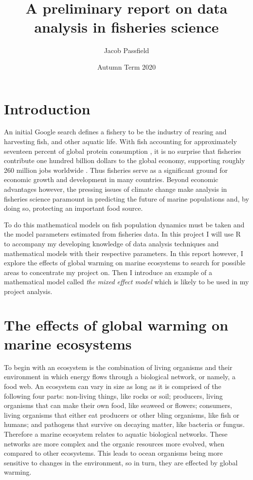 \documentclass{article}
\title{\huge{\bf{A preliminary report on data analysis in fisheries science}}}
\author{Jacob Passfield}
\date{Autumn Term 2020}
\begin{document}
\maketitle

\section{Introduction}

An initial Google search defines a fishery to be the industry of rearing and harvesting fish, and other aquatic life. With fish accounting for approximately seventeen percent of global protein consumption \cite{YouTube2017}, it is no surprise that fisheries contribute one hundred billion dollars to the global economy, supporting roughly 260 million jobs worldwide \cite{Big data}. Thus fisheries serve as a significant ground for economic growth and development in many countries. Beyond economic advantages however, the pressing issues of climate change make analysis in fisheries science paramount in predicting the future of marine populations and, by doing so, protecting an important food source. 

To do this mathematical models on fish population dynamics must be taken and the model parameters estimated from fisheries data. In this project I will use R to accompany my developing knowledge of data analysis techniques and mathematical models with their respective parameters. In this report however, I explore the effects of global warming on marine ecosystems to search for  possible areas to concentrate my project on. Then I introduce an example of a mathematical model called \textit{the mixed effect model} which is likely to be used in my project analysis. 

\section{The effects of global warming on marine ecosystems}

To begin with an ecosystem is the combination of living organisms and their environment in which energy flows through a biological network, or namely, a food web. An ecosystem can vary in size as long as it is comprised of the following four parts: non-living things, like rocks or soil; producers, living organisms that can make their own food, like seaweed or flowers; consumers, living organisms that either eat producers or other bling organisms, like fish or humans; and pathogens that survive on decaying matter, like bacteria or fungus. Therefore a marine ecosystem relates to aquatic biological networks. These networks are more complex and the organic resources more evolved, when compared to other ecosystems. This leads to ocean organisms being more sensitive to changes in the environment, so in turn, they are effected by global warming. 
\end{document}
